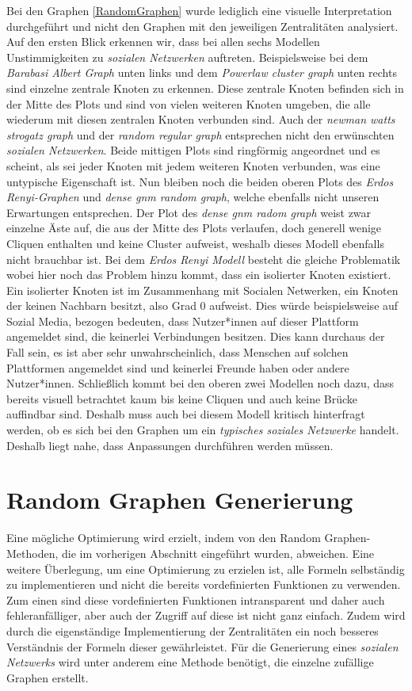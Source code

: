 Bei den Graphen \ref{RandomGraphen} wurde lediglich eine visuelle Interpretation durchgeführt und nicht den Graphen mit den jeweiligen Zentralitäten analysiert. Auf den ersten Blick erkennen wir, dass bei allen sechs Modellen Unstimmigkeiten zu \textit{sozialen Netzwerken} auftreten. Beispielsweise bei dem \textit{Barabasi Albert Graph} unten links und dem \textit{Powerlaw cluster graph} unten rechts sind einzelne zentrale Knoten zu erkennen. Diese zentrale Knoten befinden sich in der Mitte des Plots und sind von vielen weiteren Knoten umgeben, die alle wiederum mit diesen zentralen Knoten verbunden sind. Auch der \textit{newman watts strogatz graph} und der \textit{random regular graph} entsprechen nicht den erwünschten \textit{sozialen Netzwerken}. Beide mittigen Plots sind ringförmig angeordnet und es scheint, als sei jeder Knoten mit jedem weiteren Knoten verbunden, was eine untypische Eigenschaft ist. Nun bleiben noch die beiden oberen Plots des \textit{Erdos Renyi-Graphen} und \textit{dense gnm random graph}, welche ebenfalls nicht unseren Erwartungen entsprechen. Der Plot des \textit{dense gnm radom graph} weist zwar einzelne Äste auf, die aus der Mitte des Plots verlaufen, doch generell wenige Cliquen enthalten und keine Cluster aufweist, weshalb dieses Modell ebenfalls nicht brauchbar ist. Bei dem \textit{Erdos Renyi Modell} besteht die gleiche Problematik wobei hier noch das Problem hinzu kommt, dass ein isolierter Knoten existiert. Ein isolierter Knoten ist im Zusammenhang mit Socialen Netwerken, ein Knoten der keinen Nachbarn besitzt, also Grad $0$ aufweist.
Dies würde beispielsweise auf Sozial Media, bezogen bedeuten, dass Nutzer*innen auf dieser Plattform angemeldet sind, die keinerlei Verbindungen besitzen. Dies kann durchaus der Fall sein, es ist aber sehr unwahrscheinlich, dass Menschen auf solchen Plattformen angemeldet sind und keinerlei Freunde haben oder andere Nutzer*innen. Schließlich kommt bei den oberen zwei Modellen noch dazu, dass bereits visuell betrachtet kaum bis keine Cliquen und auch keine Brücke auffindbar sind. Deshalb muss auch bei diesem Modell kritisch hinterfragt werden, ob es sich bei den Graphen um ein \textit{typisches soziales Netzwerke} handelt. Deshalb liegt nahe, dass Anpassungen durchführen werden müssen.

\section{Random Graphen Generierung}
Eine mögliche Optimierung wird erzielt, indem von den Random Graphen-Methoden, die im vorherigen Abschnitt eingeführt wurden, abweichen. Eine weitere Überlegung, um eine Optimierung zu erzielen ist, alle Formeln selbständig zu implementieren und nicht die bereits vordefinierten Funktionen zu verwenden. Zum einen sind diese vordefinierten Funktionen intransparent und daher auch fehleranfälliger, aber auch der Zugriff auf diese ist nicht ganz einfach. Zudem wird durch die eigenständige Implementierung der Zentralitäten ein noch besseres Verständnis der Formeln dieser gewährleistet.
Für die Generierung eines \textit{sozialen Netzwerks} wird unter anderem eine Methode benötigt, die einzelne zufällige Graphen erstellt. 

